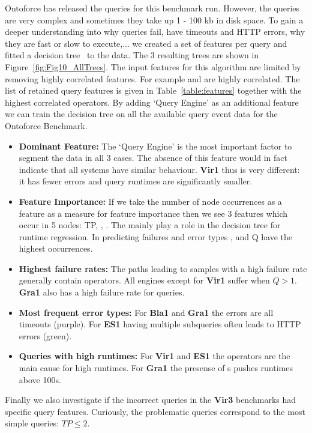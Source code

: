 Ontoforce has released the queries for this benchmark run. However, the queries are very complex and sometimes they take up 1 - 100 kb in disk space. To gain a deeper understanding into why queries fail, have timeouts and HTTP errors, why they are fast or slow to execute,... we created a set of features per query and fitted a decision tree~\cite{sklearndtree} to the data. The 3 resulting trees are shown in Figure~\ref{fig:Fig10_AllTrees}. The input features for this algorithm are limited by removing highly correlated features. For example  and  are highly correlated. The list of retained query features is given in Table~\ref{table:features} together with the highest correlated operators.
By adding `Query Engine' as an additional feature we can train the decision tree on all the available query event data for the Ontoforce Benchmark. 
\begin{itemize}
	\item \textbf{Dominant Feature:} The `Query Engine' is the most important factor to segment the data in all 3 cases. The absence of this feature would in fact indicate that all systems have similar behaviour. \textbf{Vir1} thus is very different: it has fewer errors and query runtimes are significantly smaller.
	\item \textbf{Feature Importance:} If we take the number of node occurrences as a feature as a measure for feature importance then we see 3 features which occur in 5 nodes: TP, , . The  mainly play a role in the decision tree for runtime regression. In predicting failures and error types ,  and Q have the highest occurrences.
	\item \textbf{Highest failure rates:} The paths leading to samples with a high failure rate generally contain  operators. All engines except for \textbf{Vir1} suffer when $Q > 1$. \textbf{Gra1} also has a high failure rate for  queries.
	\item \textbf{Most frequent error types:} For \textbf{Bla1} and \textbf{Gra1} the errors are all timeouts (purple). For \textbf{ES1} having multiple subqueries often leads to HTTP errors (green). 
	\item \textbf{Queries with high runtimes:} For \textbf{Vir1} and \textbf{ES1} the  operators are the main cause for high runtimes. For \textbf{Gra1} the presense of s pushes runtimes above 100s. 
\end{itemize}

Finally we also investigate if the incorrect queries in the \textbf{Vir3} benchmarks had specific query features. Curiously, the problematic queries correspond to the most simple queries: $TP \leq 2$.	
